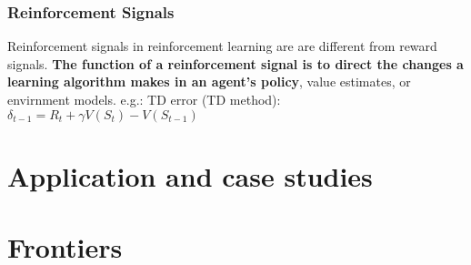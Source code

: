 \documentclass[10pt, landscape, a4paper]{article}
\begin{document}
\begin{multicols}{3}
        \subsubsection{Reinforcement Signals}
        Reinforcement signals in reinforcement learning are are different from reward signals.
        \textbf{The function of a reinforcement signal is to direct the changes a learning algorithm makes in an agent's policy}, value estimates, or envirnment models.
        e.g.:
        TD error (TD method):
        $\delta_{t-1}=R_t+\gamma V(S_t)-V(S_{t-1})$


        \section{Application and case studies}


        \section{Frontiers}
    \end{multicols}
\end{document}
